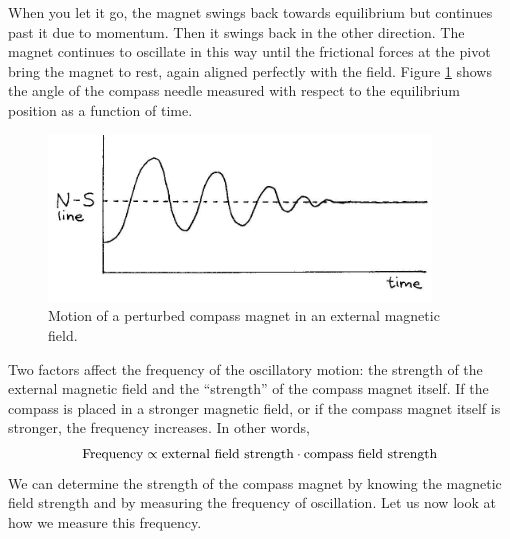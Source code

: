 When you let it go, the magnet swings back towards equilibrium but continues past it due to momentum.  Then it swings back in the other direction.  The magnet continues to oscillate in this way until the frictional forces at the pivot bring the magnet to rest, again aligned perfectly with the field.  Figure \ref{Fig9-11} shows the angle of the compass needle measured with respect to the equilibrium position as a function of time.
\begin{figure}[h]
	\centering
	\includegraphics[width=4.0in]{./figures/Topic9/Fig9-11.jpg}
	\caption{Motion of a perturbed compass magnet in an external magnetic field.}
 	\label{Fig9-11}
\end{figure} 
Two factors affect the frequency of the oscillatory motion: the strength of the external magnetic field and the ``strength'' of the compass magnet itself.  If the compass is placed in a stronger magnetic field, or if the compass magnet itself is stronger, the frequency increases.  In other words,
$${\rm Frequency}\propto{\rm external~field~strength}\cdot{\rm compass~field~strength}$$
We can determine the strength of the compass magnet by knowing the magnetic field strength and by measuring the frequency of oscillation.  Let us now look at how we measure this frequency.

